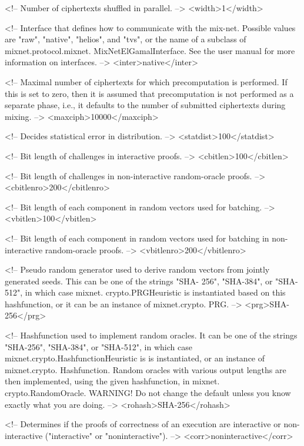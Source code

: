    <!-- Number of ciphertexts shuffled in parallel. -->
   <width>1</width>

   <!-- Interface that defines how to communicate with the mix-net. 
        Possible values are "raw", "native", "helios", and "tvs", or 
        the name of a subclass of mixnet.protocol.mixnet.
        MixNetElGamalInterface. See the user manual for more 
        information on interfaces. -->
   <inter>native</inter>

   <!-- Maximal number of ciphertexts for which precomputation is 
        performed. If this is set to zero, then it is assumed that 
        precomputation is not performed as a separate phase, i.e., it 
        defaults to the number of submitted ciphertexts during mixing. 
        -->
   <maxciph>10000</maxciph>

   <!-- Decides statistical error in distribution. -->
   <statdist>100</statdist>

   <!-- Bit length of challenges in interactive proofs. -->
   <cbitlen>100</cbitlen>

   <!-- Bit length of challenges in non-interactive random-oracle 
        proofs. -->
   <cbitlenro>200</cbitlenro>

   <!-- Bit length of each component in random vectors used for 
        batching. -->
   <vbitlen>100</vbitlen>

   <!-- Bit length of each component in random vectors used for 
        batching in non-interactive random-oracle proofs. -->
   <vbitlenro>200</vbitlenro>

   <!-- Pseudo random generator used to derive random vectors from 
        jointly generated seeds. This can be one of the strings "SHA-
        256", "SHA-384", or "SHA-512", in which case mixnet.
        crypto.PRGHeuristic is instantiated based on this 
        hashfunction, or it can be an instance of mixnet.crypto.
        PRG. -->
   <prg>SHA-256</prg>

   <!-- Hashfunction used to implement random oracles. It can be one 
        of the strings "SHA-256", "SHA-384", or "SHA-512", in which 
        case mixnet.crypto.HashfunctionHeuristic is is 
        instantiated, or an instance of mixnet.crypto.
        Hashfunction. Random oracles with various output lengths are 
        then implemented, using the given hashfunction, in mixnet.
        crypto.RandomOracle.
        WARNING! Do not change the default unless you know exactly 
        what you are doing. -->
   <rohash>SHA-256</rohash>

   <!-- Determines if the proofs of correctness of an execution are 
        interactive or non-interactive ("interactive" or 
        "noninteractive"). -->
   <corr>noninteractive</corr>

